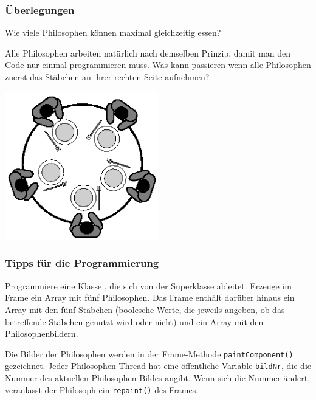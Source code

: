 \begin{minipage}{0.6\textwidth}
\subsubsection{Überlegungen}

\begin{compactitem}
\item Wie viele Philosophen können maximal gleichzeitig essen?

\item Alle Philosophen arbeiten natürlich nach demselben Prinzip, damit man den
Code nur einmal programmieren muss. Was kann passieren wenn alle Philosophen
zuerst das Stäbchen an ihrer rechten Seite aufnehmen?
\end{compactitem}
\end{minipage}
\begin{minipage}{0.4\textwidth}
\begin{center}
\includegraphics[width=0.5\textwidth]{./inf/SEKII/26_Java_Threads/Dining_Philosophers.png}
\end{center}
\end{minipage}

\subsubsection{Tipps für die Programmierung}

Programmiere eine Klasse , die sich von der Superklasse
 ableitet. Erzeuge im Frame ein Array mit fünf Philosophen. Das
Frame enthält darüber hinaus ein Array mit den fünf Stäbchen (boolesche Werte,
die jeweils angeben, ob das betreffende Stäbchen genutzt wird oder nicht) und
ein Array mit den Philosophenbildern.

Die Bilder der Philosophen werden in der Frame-Methode
\lstinline|paintComponent()| gezeichnet. Jeder Philosophen-Thread hat eine
öffentliche Variable \lstinline|bildNr|, die die Nummer des aktuellen
Philosophen-Bildes angibt. Wenn sich die Nummer ändert, veranlasst der
Philosoph ein \lstinline|repaint()| des Frames.

